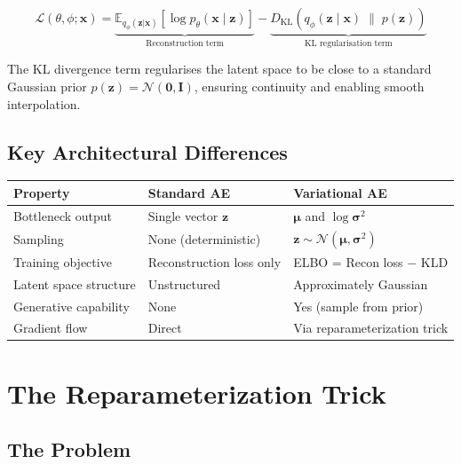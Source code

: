 \documentclass[12pt,a4paper]{article}
\begin{document}
\begin{equation}
    \mathcal{L}(\theta, \phi; \mathbf{x}) = \underbrace{\mathbb{E}_{q_\phi(\mathbf{z}|\mathbf{x})}\!\left[\log p_\theta(\mathbf{x} \mid \mathbf{z})\right]}_{\text{Reconstruction term}} - \underbrace{D_{\mathrm{KL}}\!\left(q_\phi(\mathbf{z} \mid \mathbf{x}) \;\big\|\; p(\mathbf{z})\right)}_{\text{KL regularisation term}}
\end{equation}

The KL divergence term regularises the latent space to be close to a standard Gaussian prior $p(\mathbf{z}) = \mathcal{N}(\mathbf{0}, \mathbf{I})$, ensuring continuity and enabling smooth interpolation.

\subsection{Key Architectural Differences}

\begin{center}
\begin{tabular}{lll}
\toprule
\textbf{Property} & \textbf{Standard AE} & \textbf{Variational AE} \\
\midrule
Bottleneck output & Single vector $\mathbf{z}$ & $\boldsymbol{\mu}$ and $\log\boldsymbol{\sigma}^2$ \\
Sampling & None (deterministic) & $\mathbf{z} \sim \mathcal{N}(\boldsymbol{\mu}, \boldsymbol{\sigma}^2)$ \\
Training objective & Reconstruction loss only & ELBO = Recon loss $-$ KLD \\
Latent space structure & Unstructured & Approximately Gaussian \\
Generative capability & None & Yes (sample from prior) \\
Gradient flow & Direct & Via reparameterization trick \\
\bottomrule
\end{tabular}
\end{center}

\section{The Reparameterization Trick}

\subsection{The Problem}
\end{document}
